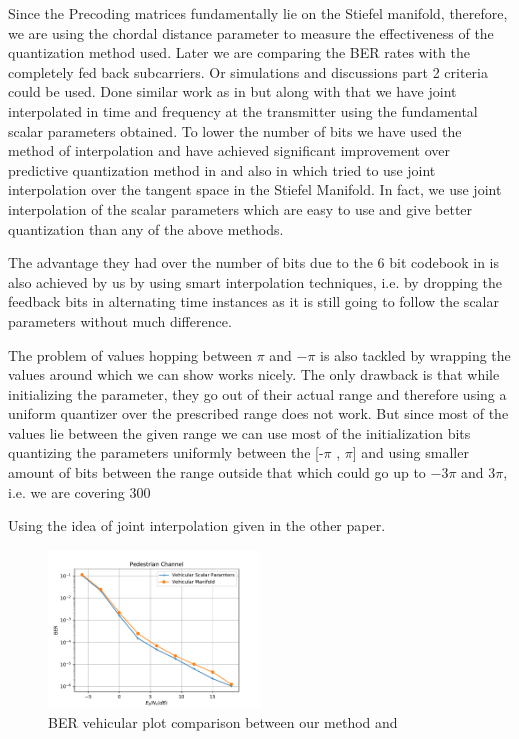 \documentclass[conference]{IEEEtran}
\begin{document}
  

\noindent Since the Precoding matrices fundamentally lie on the Stiefel manifold, therefore, we are using the chordal distance parameter to measure the effectiveness of the quantization method used. Later we are comparing the BER rates with the completely fed back subcarriers. Or simulations and discussions part 2 criteria could be used. Done similar work as in \cite{4114278} but along with that we have joint interpolated in time and frequency at the transmitter using the fundamental scalar parameters obtained. To lower the number of bits we have used the method of interpolation and have achieved significant improvement over predictive quantization method in \cite{6891198} and also in \cite{Gupt1905:Predictive} which tried to use joint interpolation over the tangent space in the Stiefel Manifold. In fact, we use joint interpolation of the scalar parameters which are easy to use and give better quantization than any of the above methods.

The advantage they had over the number of bits due to the 6 bit codebook in \cite{6891198,Gupt1905:Predictive} is also achieved by us by using smart interpolation techniques, i.e. by dropping the feedback bits in alternating time instances as it is still going to follow the scalar parameters without much difference.

The problem of values hopping between $\pi$ and $-\pi$ is also tackled by wrapping the values around which we can show works nicely. The only drawback is that while initializing the parameter, they go out of their actual range and therefore using a uniform quantizer over the prescribed range does not work. But since most of the values lie between the given range we can use most of the initialization bits quantizing the parameters uniformly between the [-$\pi$ , $\pi$] and using smaller amount of bits between the range outside that which could go up to $-3\pi$ and $3\pi$, i.e. we are covering 300%

Using the idea of joint interpolation given in the other paper. 

\begin{figure} 
\includegraphics[width=0.5\textwidth]{images/vehicular_ber.pdf}
\caption{BER vehicular plot comparison between our method and \cite{Gupt1905:Predictive}} 
\label{ber_overview} 
\vspace{-5pt} 
\end{figure} 
\end{document}
